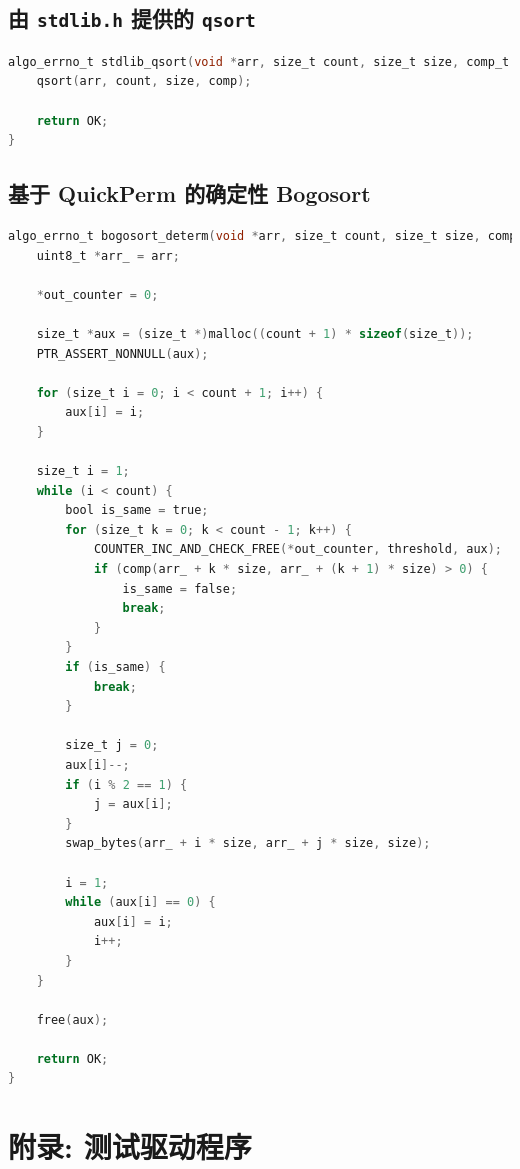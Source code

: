\documentclass[12pt]{article}
\begin{document}
\subsection{由 \texttt{stdlib.h} 提供的 \texttt{qsort}}

\begin{lstlisting}[language=C]
algo_errno_t stdlib_qsort(void *arr, size_t count, size_t size, comp_t comp, uint64_t threshold, uint64_t *out_counter) {
    qsort(arr, count, size, comp);

    return OK;
}
\end{lstlisting}

\subsection{基于 QuickPerm 的确定性 Bogosort}

\begin{lstlisting}[language=C]
algo_errno_t bogosort_determ(void *arr, size_t count, size_t size, comp_t comp, uint64_t threshold, uint64_t *out_counter) {
    uint8_t *arr_ = arr;

    *out_counter = 0;

    size_t *aux = (size_t *)malloc((count + 1) * sizeof(size_t));
    PTR_ASSERT_NONNULL(aux);

    for (size_t i = 0; i < count + 1; i++) {
        aux[i] = i;
    }

    size_t i = 1;
    while (i < count) {
        bool is_same = true;
        for (size_t k = 0; k < count - 1; k++) {
            COUNTER_INC_AND_CHECK_FREE(*out_counter, threshold, aux);
            if (comp(arr_ + k * size, arr_ + (k + 1) * size) > 0) {
                is_same = false;
                break;
            }
        }
        if (is_same) {
            break;
        }

        size_t j = 0;
        aux[i]--;
        if (i % 2 == 1) {
            j = aux[i];
        }
        swap_bytes(arr_ + i * size, arr_ + j * size, size);

        i = 1;
        while (aux[i] == 0) {
            aux[i] = i;
            i++;
        }
    }

    free(aux);

    return OK;
}
\end{lstlisting}

\section{附录: 测试驱动程序}
\end{document}
